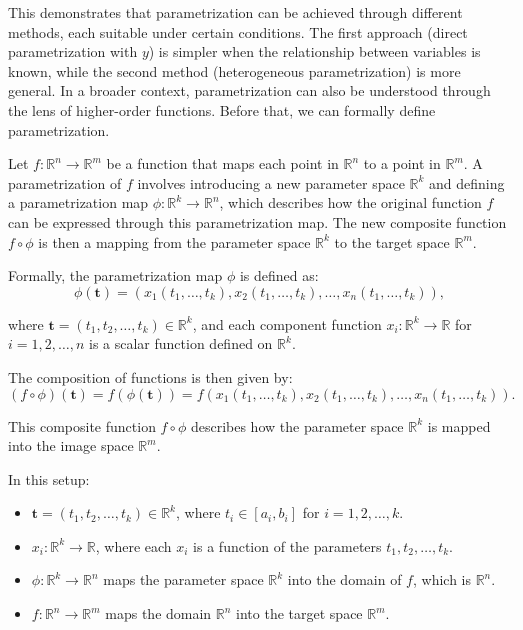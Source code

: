 \documentclass[12pt,a4paper]{article}
\begin{document}
\begin{remark}
This demonstrates that parametrization can be achieved through different methods, each suitable under certain conditions. The first approach (direct parametrization with \( y \)) is simpler when the relationship between variables is known, while the second method (heterogeneous parametrization) is more general.
In a broader context, parametrization can also be understood through the lens of higher-order functions. Before that, we can formally define parametrization.
\begin{definition}[Parametrization]
Let \( f: \mathbb{R}^n \to \mathbb{R}^m \) be a function that maps each point in \( \mathbb{R}^n \) to a point in \( \mathbb{R}^m \). A parametrization of \( f \) involves introducing a new parameter space \( \mathbb{R}^k \) and defining a parametrization map \( \phi: \mathbb{R}^k \to \mathbb{R}^n \), which describes how the original function \( f \) can be expressed through this parametrization map. The new composite function \( f \circ \phi \) is then a mapping from the parameter space \( \mathbb{R}^k \) to the target space \( \mathbb{R}^m \).

Formally, the parametrization map \( \phi \) is defined as:
\[
\phi(\mathbf{t}) = \left( x_1(t_1, \dots, t_k), x_2(t_1, \dots, t_k), \dots, x_n(t_1, \dots, t_k) \right),
\]

where \( \mathbf{t} = (t_1, t_2, \dots, t_k) \in \mathbb{R}^k \), and each component function \( x_i: \mathbb{R}^k \to \mathbb{R} \) for \( i = 1, 2, \dots, n \) is a scalar function defined on \( \mathbb{R}^k \).

The composition of functions is then given by:
\[
(f \circ \phi)(\mathbf{t}) = f(\phi(\mathbf{t})) = f\left( x_1(t_1, \dots, t_k), x_2(t_1, \dots, t_k), \dots, x_n(t_1, \dots, t_k) \right).
\]

This composite function \( f \circ \phi \) describes how the parameter space \( \mathbb{R}^k \) is mapped into the image space \( \mathbb{R}^m \).

In this setup:
\begin{itemize}
    \item \( \mathbf{t} = (t_1, t_2, \dots, t_k) \in \mathbb{R}^k \), where \( t_i \in [a_i, b_i] \) for \( i = 1, 2, \dots, k \).
    \item \( x_i: \mathbb{R}^k \to \mathbb{R} \), where each \( x_i \) is a function of the parameters \( t_1, t_2, \dots, t_k \).
    \item \( \phi: \mathbb{R}^k \to \mathbb{R}^n \) maps the parameter space \( \mathbb{R}^k \) into the domain of \( f \), which is \( \mathbb{R}^n \).
    \item \( f: \mathbb{R}^n \to \mathbb{R}^m \) maps the domain \( \mathbb{R}^n \) into the target space \( \mathbb{R}^m \).
\end{itemize}


\end{definition}
\end{remark}
\end{document}
